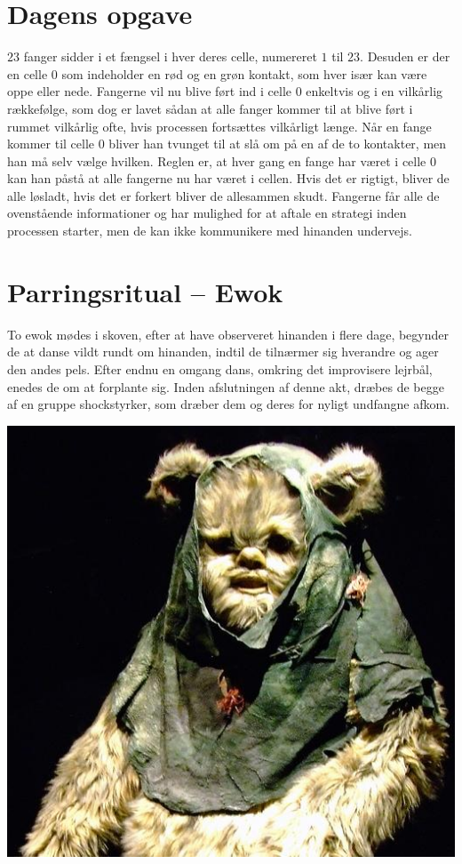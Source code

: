 \begin{minipage}[t]{100mm}
\vspace{3mm}
\section*{Dagens opgave}
$23$ fanger sidder i et fængsel i hver deres celle, numereret $1$ til $23$. Desuden er der en celle $0$ som indeholder en rød og en grøn kontakt, som hver især kan være oppe eller nede. Fangerne vil nu blive ført ind i celle $0$ enkeltvis og i en vilkårlig rækkefølge, som dog er lavet sådan at alle fanger kommer til at blive ført i rummet vilkårlig ofte, hvis processen fortsættes vilkårligt længe. Når en fange kommer til celle $0$ bliver han tvunget til at slå om på en af de to kontakter, men han må selv vælge hvilken. Reglen er, at hver gang en fange har været i celle $0$ kan han påstå at alle fangerne nu har været i cellen. Hvis det er rigtigt, bliver de alle løsladt, hvis det er forkert bliver de allesammen skudt. Fangerne får alle de ovenstående informationer og har mulighed for at aftale en strategi inden processen starter, men de kan ikke kommunikere med hinanden undervejs.

\section*{Parringsritual -- Ewok}
To ewok mødes i skoven, efter at have observeret hinanden i flere dage, begynder de at danse vildt rundt om hinanden, indtil de tilnærmer sig hverandre og ager den andes pels. Efter endnu en omgang dans, omkring det improvisere lejrbål, enedes de om at forplante sig. Inden afslutningen af denne akt, dræbes de begge af en gruppe shockstyrker, som dræber dem og deres for nyligt undfangne afkom.

\begin{center}
\includegraphics[width=0.8\linewidth]{Ewok.jpg}


\end{center}
\end{minipage}

